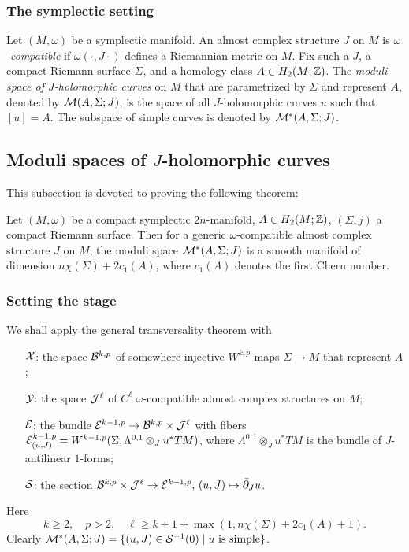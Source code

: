\subsubsection{The symplectic setting}
Let $(M, \omega)$ be a symplectic manifold. 
An almost complex structure $J$ on $M$ is \textit{$\omega$-compatible} 
if $\omega(\cdot, J \cdot)$ defines a Riemannian metric on $M$. 
Fix such a $J$, a compact Riemann surface $\Sigma$, and 
a homology class $A \in H_2 (M; {\mathbb{Z}})$. 
The \textit{moduli space of $J$-holomorphic curves} on $M$ 
that are parametrized by $\Sigma$ and represent $A$, denoted by 
${\mathcal{M}}(A, \Sigma; J)$, is the space of all $J$-holomorphic curves $u$ 
such that $[u] = A$. 
The subspace of simple curves is denoted by ${\mathcal{M}}^*(A, \Sigma; J)$.

\subsection{Moduli spaces of $J$-holomorphic curves}
This subsection is devoted to proving the following theorem:

\begin{theorem}
	Let $(M, \omega)$ be a compact symplectic $2n$-manifold, 
	$A \in H_2 (M; {\mathbb{Z}})$, $(\Sigma, j)$ a compact Riemann surface. 
	Then for a generic $\omega$-compatible almost complex structure 
	$J$ on $M$, the moduli space ${\mathcal{M}}^*(A, \Sigma; J)$ 
	is a smooth manifold of dimension $n \chi(\Sigma) + 2 c_1(A)$, 
	where $c_1(A)$ denotes the first Chern number.
\end{theorem}

\subsubsection{Setting the stage}
We shall apply the general transversality theorem with
\begin{itemize}
	\item[${\mathcal{X}}$:] 
		the space ${\mathcal{B}}^{k, p}$ of somewhere injective $W^{k, p}$ maps
		$\Sigma \to M$ that represent $A$;
	\item[${\mathcal{Y}}$:] 
		the space ${\mathcal{J}}^\ell$ of $C^\ell$ $\omega$-compatible 
		almost complex structures on $M$;
	\item[${\mathcal{E}}$:] 
		the bundle ${\mathcal{E}}^{k - 1, p} \to {\mathcal{B}}^{k, p} \times {\mathcal{J}}^\ell$ 
		with fibers ${\mathcal{E}}_{(u, J)}^{k - 1, p} = 
		W^{k - 1, p} (\Sigma, \Lambda^{0, 1} \otimes_J u^*TM)$, 
		where $\Lambda^{0, 1} \otimes_J u^*TM$ is the bundle 
		of $J$-antilinear $1$-forms;
	\item[${\mathcal{S}}$:] 
		the section ${\mathcal{B}}^{k, p} \times {\mathcal{J}}^\ell \to {\mathcal{E}}^{k - 1, p},\, 
		(u, J) \mapsto {\bar{\partial}}_J u$.
\end{itemize}
Here 
\[
	k \geq 2, \quad p > 2, \quad
	\ell \geq k + 1 + \max (1, n\chi(\Sigma) + 2 c_1(A) + 1).
\] 
Clearly 
${\mathcal{M}}^*(A, \Sigma; J) = \{ (u, J) \in {\mathcal{S}}^{-1} (0) \mid u\text{ is simple} \}$.

